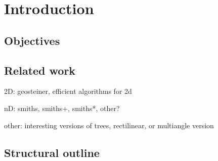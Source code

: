 {
\abnormalparskip{0pt}
\chapter{Introduction}
\label{cha:introduction}
}


\section{Objectives}
\label{sec:objectives}


\section{Related work}
\label{sec:related-work}

2D: geosteiner, efficient algorithms for 2d

nD: smiths, smiths+, smiths*, other?

other: interesting versions of trees, rectilinear, or multiangle version


\section{Structural outline}
\label{sec:structural-outline}


\chapterbreak{}

